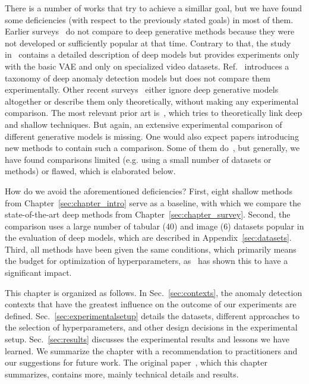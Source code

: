 There is a number of works that try to achieve a simillar goal, but we have found some deficiencies (with respect to the previously stated goals) in most of them. Earlier surveys~\cite{pimentel2014review, campos2016evaluation, goldstein2016comparative, pevny2016loda} do not compare to deep generative methods because they were not developed or sufficiently popular at that time. Contrary to that, the study in~\cite{kiran2018overview} contains a detailed description of deep models but provides experiments only with the basic VAE and only on specialized video datasets. Ref.~\cite{chalapathy2019deep} introduces a taxonomy of deep anomaly detection models but does not compare them experimentally. Other recent surveys~\cite{moustafa2019holistic, kwon2019survey, fernandes2019comprehensive, wang2019progress, pang2020deep} either ignore deep generative models altogether or describe them only theoretically, without making any experimental comparison. The most relevant prior art is~\cite{ruff2020unifying}, which tries to theoretically link deep and shallow techniques. But again, an extensive experimental comparison of different generative models is missing. One would also expect papers introducing new methods to contain such a comparison. Some of them do~\cite{pevny2016loda}, but generally, we have found comparisons limited (e.g. using a small number of datasets or methods) or flawed, which is elaborated below.

How do we avoid the aforementioned deficiencies? First, eight shallow methods from Chapter~\ref{sec:chapter_intro} serve as a baseline, with which we compare the state-of-the-art deep methods from Chapter~\ref{sec:chapter_survey}. Second, the comparison uses a large number of tabular (40) and image (6) datasets popular in the evaluation of deep models, which are described in Appendix~\ref{sec:datasets}. Third, all methods have been given the same conditions, which primarily means the budget for optimization of hyperparameters, as~\cite{vskvara2018generative} has shown this to have a significant impact.

This chapter is organized as follows. In Sec.~\ref{sec:contexts}, the anomaly detection contexts that have the greatest influence on the outcome of our experiments are defined. Sec.~\ref{sec:experimentalsetup} details the datasets,  different approaches to the selection of hyperparameters, and other design decisions in the experimental setup. Sec.~\ref{sec:results} discusses the experimental results and lessons we have learned. We summarize the chapter with a recommendation to practitioners and our suggestions for future work. The original paper~\cite{vskvara2021comparison}, which this chapter summarizes, contains more, mainly technical details and results.

